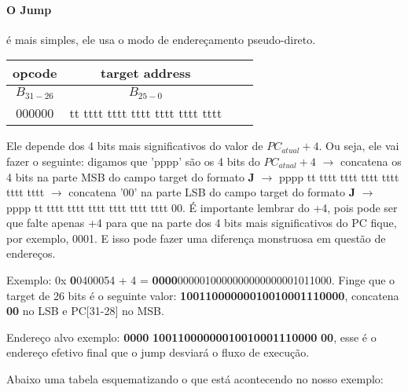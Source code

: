 \documentclass{article}
\begin{document}
\paragraph{O Jump} é mais simples, ele usa o modo de endereçamento
pseudo-direto.

\begin{table}[ht!]
  \begin{tabular}{|c|c|c|c|}
    \hline opcode & target address \\
    \hline $B_{31-26}$ & $B_{25-0}$ \\
    \hline 000000 & tt tttt tttt tttt tttt tttt tttt \\
    \hline
  \end{tabular}
\end{table}

Ele depende dos 4 bits mais significativos do valor de $PC_{atual} + 4$. Ou
seja, ele vai fazer o seguinte: digamos que 'pppp' são os 4 bits do $PC_{atual}
+ 4$ $\rightarrow$ concatena os 4 bits na parte MSB do campo target do formato
\textbf{J} $\rightarrow$ pppp tt tttt tttt tttt tttt tttt tttt $\rightarrow$
concatena '00' na parte LSB do campo target do formato \textbf{J} $\rightarrow$
pppp tt tttt tttt tttt tttt tttt tttt 00. É importante lembrar do +4, pois pode
ser que falte apenas +4 para que na parte dos 4 bits mais significativos do PC
fique, por exemplo, 0001. E isso pode fazer uma diferença monstruosa em questão
de endereços.

Exemplo: 0x\textbf{\color{Red} 0}0400054 + 4 = \textbf{\color{Red}
0000}0000010000000000000001011000. Finge que o target de 26 bits é o seguinte
valor: \textbf{\color{Blue} 10011000000010010001110000}, concatena
\textbf{\color{Green} 00} no LSB e PC[31-28] no MSB.

Endereço alvo exemplo: \textbf{\color{Red} 0000}\textbf{\color{Blue}
10011000000010010001110000}\textbf{\color{Green} 00}, esse é o endereço efetivo 
final que o jump desviará o fluxo de execução.

Abaixo uma tabela esquematizando o que está acontecendo no nosso exemplo:
\end{document}

